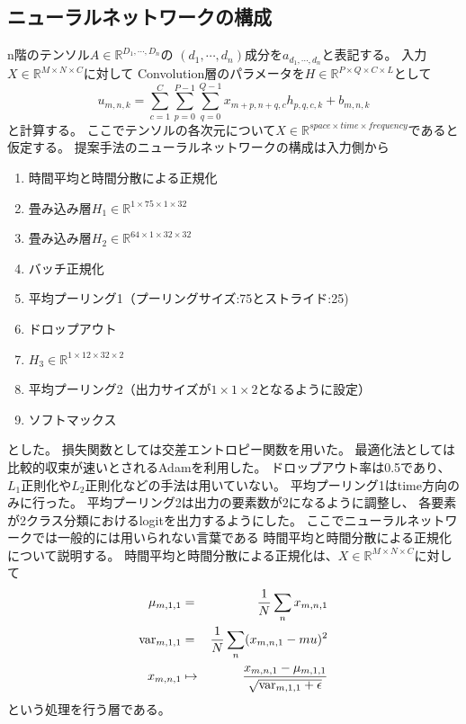 \subsection{\mc ニューラルネットワークの構成}
n階のテンソル\(A\in \mathbb R^{D_1,\cdots ,D_n}\)の
\((d_1,\cdots,d_n)\)成分を\(a_{d_1,\cdots,d_n}\)と表記する。
入力\(X \in \mathbb R^{M\times N\times C}\)に対して
Convolution層のパラメータを\(H \in \mathbb R^{P\times Q \times C \times L}\)として
\begin{equation}
    u_{m,n,k} = \sum_{c=1}^C\sum_{p=0}^{P-1}\sum_{q=0}^{Q-1} x_{m+p,n+q,c} h_{p,q,c,k} + b_{m,n,k}
\end{equation} 
と計算する。
ここでテンソルの各次元について\(X \in \mathbb R^{space\times time\times frequency}\)であると仮定する。
提案手法のニューラルネットワークの構成は入力側から
\begin{enumerate}
    \item 時間平均と時間分散による正規化
    \item 畳み込み層\(H_1 \in \mathbb R^{1\times 75 \times 1 \times 32}\)
    \item 畳み込み層\(H_2 \in \mathbb R^{64\times 1 \times 32 \times 32}\)
    \item バッチ正規化
    \item 平均プーリング1（プーリングサイズ:75とストライド:25)
    \item ドロップアウト
    \item \(H_3 \in \mathbb R^{1\times 12 \times 32 \times 2}\)
    \item 平均プーリング2（出力サイズが\(1\times 1\times 2\)となるように設定）
    \item ソフトマックス
\end{enumerate}
とした。
損失関数としては交差エントロピー関数を用いた。
最適化法としては比較的収束が速いとされるAdamを利用した。
ドロップアウト率は0.5であり、\(L_1\)正則化や\(L_2\)正則化などの手法は用いていない。
平均プーリング1はtime方向のみに行った。
平均プーリング2は出力の要素数が\(2\)になるように調整し、
各要素が2クラス分類におけるlogitを出力するようにした。
ここでニューラルネットワークでは一般的には用いられない言葉である
時間平均と時間分散による正規化について説明する。
時間平均と時間分散による正規化は、\(X \in \mathbb R^{M\times N\times C}\)に対して
\begin{eqnarray}
    \mu_{m,1,1} & = & \frac{1}{N}\sum_n x_{m,n,1} \\
    {\rm var}_{m,1,1} & = & \frac{1}{N}\sum_n (x_{m,n,1} - mu)^2 \\
    x_{m,n,1} & \mapsto & \frac{x_{m,n,1} - \mu_{m,1,1}}{\sqrt{{\rm var}_{m,1,1}+\epsilon}}
\end{eqnarray}
という処理を行う層である。



